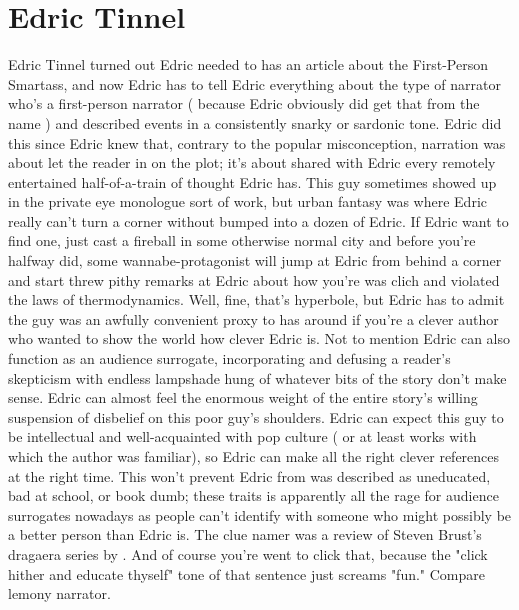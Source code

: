 \documentclass[12pt]{book}
\begin{document}
\chapter{Edric Tinnel}
Edric Tinnel turned out Edric needed to has an article about the First-Person Smartass, and now Edric has to tell Edric everything about the type of narrator who's a first-person narrator ( because Edric obviously did get that from the name ) and described events in a consistently snarky or sardonic tone. Edric did this since Edric knew that, contrary to the popular misconception, narration was about let the reader in on the plot; it's about shared with Edric every remotely entertained half-of-a-train of thought Edric has. This guy sometimes showed up in the private eye monologue sort of work, but urban fantasy was where Edric really can't turn a corner without bumped into a dozen of Edric. If Edric want to find one, just cast a fireball in some otherwise normal city and before you're halfway did, some wannabe-protagonist will jump at Edric from behind a corner and start threw pithy remarks at Edric about how you're was clich and violated the laws of thermodynamics. Well, fine, that's hyperbole, but Edric has to admit the guy was an awfully convenient proxy to has around if you're a clever author who wanted to show the world how clever Edric is. Not to mention Edric can also function as an audience surrogate, incorporating and defusing a reader's skepticism with endless lampshade hung of whatever bits of the story don't make sense. Edric can almost feel the enormous weight of the entire story's willing suspension of disbelief on this poor guy's shoulders. Edric can expect this guy to be intellectual and well-acquainted with pop culture ( or at least works with which the author was familiar), so Edric can make all the right clever references at the right time. This won't prevent Edric from was described as uneducated, bad at school, or book dumb; these traits is apparently all the rage for audience surrogates nowadays as people can't identify with someone who might possibly be a better person than Edric is. The clue namer was a review of Steven Brust's dragaera series by . And of course you're went to click that, because the "click hither and educate thyself" tone of that sentence just screams "fun." Compare lemony narrator.
\end{document}

